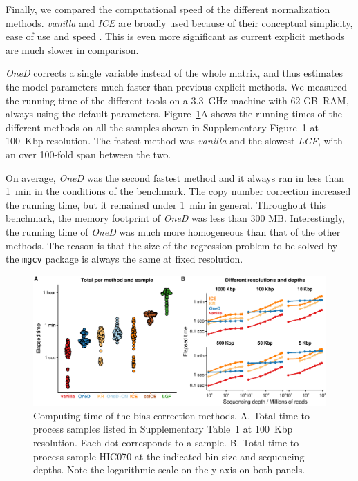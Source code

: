 \documentclass[a4,center,fleqn]{NAR}
\begin{document}
Finally, we compared the computational speed of the different
normalization methods. \textit{vanilla} and \textit{ICE} are broadly used
because of their conceptual simplicity, ease of use and speed
\citep{imakaev2012iterative}. This is even more significant as current
explicit methods \citep{servant2012hitc} are much slower in comparison.

\textit{OneD} corrects a single variable instead of the whole matrix, and
thus estimates the model parameters much faster than previous explicit
methods. We measured the running time of the different tools on a 3.3~GHz
machine with 62 GB~RAM, always using the default parameters.
Figure~\ref{fig:times}A shows the running times of the different methods
on all the samples shown in Supplementary Figure~1 at 100~Kbp resolution.
The fastest method was \textit{vanilla} and the slowest \textit{LGF}, with
an over 100-fold span between the two.

On average, \textit{OneD} was the second fastest method and it always ran in less than
1~min in the conditions of the benchmark. The copy number correction
increased the running time, but it remained under 1~min in general.
Throughout this benchmark, the memory footprint of \textit{OneD} was less
than 300 MB.  Interestingly, the running time of \textit{OneD} was much
more homogeneous than that of the other methods. The reason is that the
size of the regression problem to be solved by the \texttt{mgcv} package
is always the same at fixed resolution.

\begin{figure}
\centerline{\includegraphics[width=.49\textwidth]
  {nar_figures/figure_6.eps}}
\caption{Computing time of the bias correction methods. A. Total time to
process samples listed in Supplementary Table~1 at 100~Kbp resolution.
Each dot corresponds to a sample. B. Total time to process sample HIC070
at the indicated bin size and sequencing depths. Note the logarithmic
scale on the y-axis on both panels.}
\label{fig:times}
\end{figure}
\end{document}
